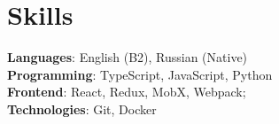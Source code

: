 \documentclass[A4,11pt]{article}
\begin{document}

\section{Skills}
\begin{itemize}[leftmargin=0.5cm, label={}]
  \small{\item{
                \textbf{Languages}{: English (B2), Russian (Native) } \\
                \textbf{Programming}{: TypeScript, JavaScript, Python } \\
                \textbf{Frontend}{: React, Redux, MobX, Webpack; } \\
                \textbf{Technologies}{: Git, Docker } \\
          }}
\end{itemize}

\end{document}
